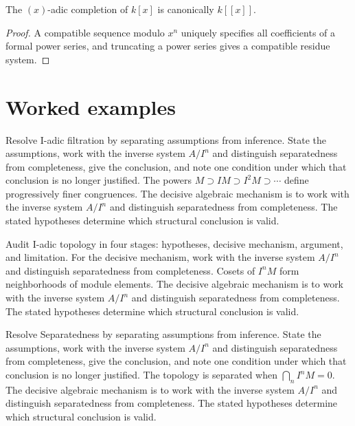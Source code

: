 \begin{theorem}\label{thm:v18-03}
The $(x)$-adic completion of $k[x]$ is canonically $k[[x]]$.
\begin{proof}
A compatible sequence modulo $x^n$ uniquely specifies all coefficients of a formal power series, and truncating a power series gives a compatible residue system.
\end{proof}
\end{theorem}

\section{Worked examples}

\begin{example}\label{ex:v18-worked-01}
Resolve I-adic filtration by separating assumptions from inference. State the assumptions, work with the inverse system \(A/I^n\) and distinguish separatedness from completeness, give the conclusion, and note one condition under which that conclusion is no longer justified. The powers $M\supset IM\supset I^2M\supset\cdots$ define progressively finer congruences. The decisive algebraic mechanism is to work with the inverse system \(A/I^n\) and distinguish separatedness from completeness. The stated hypotheses determine which structural conclusion is valid.
\end{example}

\begin{example}\label{ex:v18-worked-02}
Audit I-adic topology in four stages: hypotheses, decisive mechanism, argument, and limitation. For the decisive mechanism, work with the inverse system \(A/I^n\) and distinguish separatedness from completeness. Cosets of $I^nM$ form neighborhoods of module elements. The decisive algebraic mechanism is to work with the inverse system \(A/I^n\) and distinguish separatedness from completeness. The stated hypotheses determine which structural conclusion is valid.
\end{example}

\begin{example}\label{ex:v18-worked-03}
Resolve Separatedness by separating assumptions from inference. State the assumptions, work with the inverse system \(A/I^n\) and distinguish separatedness from completeness, give the conclusion, and note one condition under which that conclusion is no longer justified. The topology is separated when $\bigcap_n I^nM=0$. The decisive algebraic mechanism is to work with the inverse system \(A/I^n\) and distinguish separatedness from completeness. The stated hypotheses determine which structural conclusion is valid.
\end{example}

